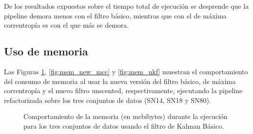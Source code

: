 De los resultados expuestos sobre el tiempo total de ejecuci\'on se desprende que la pipeline demora menos con el filtro b\'asico, mientras que con el de m\'axima correntrop\'ia es con el que m\'as se demora.

\subsection{Uso de memoria}
Las Figuras \ref{fig:mem_new_kbf}, \ref{fig:mem_new_mcc} y \ref{fig:mem_ukf} muestran el comportamiento del consumo de memoria al usar la nueva versi\'on del filtro b\'asico, de m\'axima correntrop\'ia y el nuevo filtro unscented, respectivamente, ejecutando la pipeline refactorizada sobre los tres conjuntos de datos (SN14, SN18 y SN80). 

\begin{figure}[h!]
\centering
{}\hfill
{}\vfill
{}
\caption{Comportamiento de la memoria (en mebibytes) durante la ejecuci\'on para los tres conjuntos de datos usando el filtro de Kalman B\'asico.}
\label{fig:mem_new_kbf}
\end{figure}

